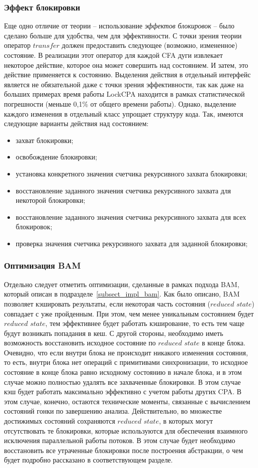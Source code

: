\subsubsection{Эффект блокировки}
Еще одно отличие от теории -- использование \textit{эффектов блокировок} -- было сделано больше для удобства, чем для эффективности.
С точки зрения теории оператор $transfer$ должен предоставить следующее (возможно, измененное) состояние.
В реализации этот оператор для каждой CFA дуги извлекает некоторое действие, которое она может совершить над состоянием. 
И затем, это действие применяется к состоянию. 
Выделения действия в отдельный интерфейс является не обязательной даже с точки зрения эффективности, так как даже на больших примерах время работы LockCPA находится в рамках статистической погрешности (меньше 0,1\% от общего времени работы).
Однако, выделение каждого изменения в отдельный класс упрощает структуру кода.
Так, имеются следующие варианты действия над состоянием:
\begin{itemize}
\item захват блокировки;
\item освобождение блокировки;
\item установка конкретного значения счетчика рекурсивного захвата блокировки;
\item восстановление заданного значения счетчика рекурсивного захвата для некоторой блокировки;
\item восстановление заданного значения счетчика рекурсивного захвата для всех блокировок;
\item проверка значения счетчика рекурсивного захвата для заданной блокировки;
\end{itemize}

\subsubsection{Оптимизация BAM}
Отдельно следует отметить оптимизации, сделанные в рамках подхода BAM, который описан в подразделе~\ref{subsect_impl_bam}.
Как было описано, BAM позволяет кэшировать результаты, если некоторая часть состояния ($reduced$ $state$) совпадает с уже пройденным. 
При этом, чем менее уникальным состоянием будет $reduced$ $state$, тем эффективнее будет работать кэширование, то есть тем чаще будут возникать попадания в кеш.
С другой стороны, необходимо иметь возможность восстановить исходное состояние по $reduced$ $state$ в конце блока.
Очевидно, что если внутри блока не происходит никакого изменения состояния, то есть, внутри блока нет операций с примитивами синхронизации, то исходное состояние в конце блока равно исходному состоянию в начале блока, и в этом случае можно полностью удалять все захваченные блокировки. 
В этом случае кэш будет работать максимально эффективно с учетом работы других CPA.
В этом случае, конечно, остаются технические моменты, связанные с вычислением состояний гонки по завершению анализа.
Действительно, во множестве достижимых состояний сохраняются $reduced$ $state$, в которых могут отсутствовать те блокировки, которые используются для обеспечения взаимного исключения параллельной работы потоков.
В этом случае будет необходимо восстановить все утраченные блокировки после построения абстракции, о чем будет подробно рассказано в соответствующем разделе.

